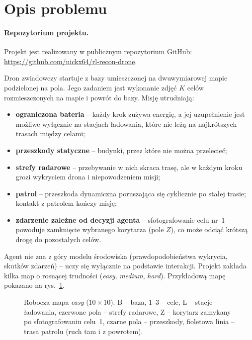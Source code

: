 \section{Opis problemu}
\label{sec:problem}

\paragraph{Repozytorium projektu.} Projekt jest realizowany w publicznym
repozytorium GitHub:
\url{https://github.com/nickx64/rl-recon-drone}.

Dron zwiadowczy startuje z bazy umieszczonej na dwuwymiarowej mapie
podzielonej na pola. Jego zadaniem jest wykonanie zdjęć $K$ celów
rozmieszczonych na mapie i powrót do bazy. Misję utrudniają:

\begin{itemize}
  \item \textbf{ograniczona bateria} -- każdy krok zużywa energię, a jej
        uzupełnienie jest możliwe wyłącznie na stacjach ładowania, które nie
        leżą na najkrótszych trasach między celami;
  \item \textbf{przeszkody statyczne} -- budynki, przez które nie można przelecieć;
  \item \textbf{strefy radarowe} -- przebywanie w nich skraca trasę, ale w
        każdym kroku grozi wykryciem drona i niepowodzeniem misji;
  \item \textbf{patrol} -- przeszkoda dynamiczna poruszająca się cyklicznie
        po stałej trasie; kontakt z patrolem kończy misję;
  \item \textbf{zdarzenie zależne od decyzji agenta} -- sfotografowanie
        celu nr~1 powoduje zamknięcie wybranego korytarza (pole $Z$), co może
        odciąć krótszą drogę do pozostałych celów.
\end{itemize}

Agent nie zna z góry modelu środowiska (prawdopodobieństwa wykrycia, skutków
zdarzeń) -- uczy się wyłącznie na podstawie interakcji. Projekt zakłada kilka
map o rosnącej trudności (\emph{easy}, \emph{medium}, \emph{hard}).
Przykładową mapę pokazano na rys.~\ref{fig:map-easy}.

\begin{figure}[h]
  \centering
  
  \caption{Robocza mapa \emph{easy} ($10\times10$). B -- baza, 1--3 -- cele,
    L -- stacje ładowania, czerwone pola -- strefy radarowe, Z -- korytarz
    zamykany po sfotografowaniu celu~1, czarne pola -- przeszkody, fioletowa
    linia -- trasa patrolu (ruch tam i z powrotem).}
  \label{fig:map-easy}
\end{figure}

